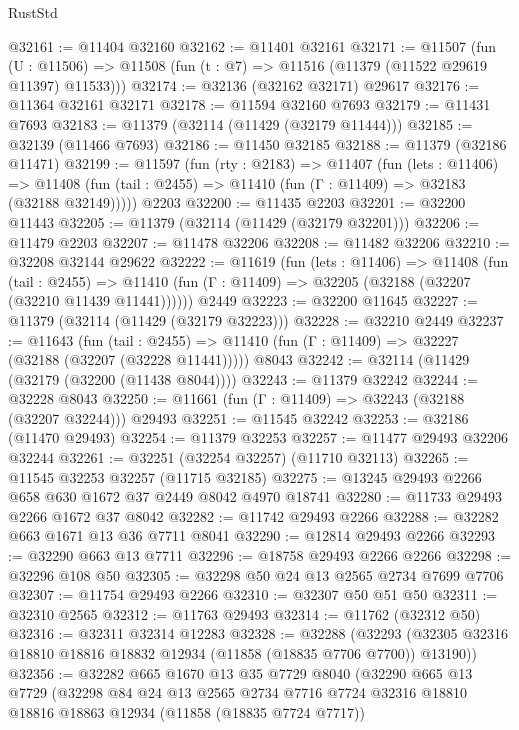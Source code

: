 \begin{lexlean}{RustStd}
\begin{coremodule}
@32161 := @11404 @32160
@32162 := @11401 @32161
@32171 := @11507
    (fun (U : @11506) => @11508 (fun (t : @7) => @11516 (@11379 (@11522 @29619 @11397) @11533)))
@32174 := @32136 (@32162 @32171) @29617
@32176 := @11364 @32161 @32171
@32178 := @11594 @32160 @7693
@32179 := @11431 @7693
@32183 := @11379 (@32114 (@11429 (@32179 @11444)))
@32185 := @32139 (@11466 @7693)
@32186 := @11450 @32185
@32188 := @11379 (@32186 @11471)
@32199 := @11597
    (fun (rty : @2183) =>
    @11407
      (fun (lets : @11406) =>
      @11408 (fun (tail : @2455) => @11410 (fun (Γ : @11409) => @32183 (@32188 @32149)))))
    @2203
@32200 := @11435 @2203
@32201 := @32200 @11443
@32205 := @11379 (@32114 (@11429 (@32179 @32201)))
@32206 := @11479 @2203
@32207 := @11478 @32206
@32208 := @11482 @32206
@32210 := @32208 @32144 @29622
@32222 := @11619
    (fun (lets : @11406) =>
    @11408
      (fun (tail : @2455) =>
      @11410 (fun (Γ : @11409) => @32205 (@32188 (@32207 (@32210 @11439 @11441))))))
    @2449
@32223 := @32200 @11645
@32227 := @11379 (@32114 (@11429 (@32179 @32223)))
@32228 := @32210 @2449
@32237 := @11643
    (fun (tail : @2455) => @11410 (fun (Γ : @11409) => @32227 (@32188 (@32207 (@32228 @11441)))))
    @8043
@32242 := @32114 (@11429 (@32179 (@32200 (@11438 @8044))))
@32243 := @11379 @32242
@32244 := @32228 @8043
@32250 := @11661 (fun (Γ : @11409) => @32243 (@32188 (@32207 @32244))) @29493
@32251 := @11545 @32242
@32253 := @32186 (@11470 @29493)
@32254 := @11379 @32253
@32257 := @11477 @29493 @32206 @32244
@32261 := @32251 (@32254 @32257) (@11710 @32113)
@32265 := @11545 @32253 @32257 (@11715 @32185)
@32275 := @13245 @29493 @2266 @658 @630 @1672 @37 @2449 @8042 @4970 @18741
@32280 := @11733 @29493 @2266 @1672 @37 @8042
@32282 := @11742 @29493 @2266
@32288 := @32282 @663 @1671 @13 @36 @7711 @8041
@32290 := @12814 @29493 @2266
@32293 := @32290 @663 @13 @7711
@32296 := @18758 @29493 @2266 @2266
@32298 := @32296 @108 @50
@32305 := @32298 @50 @24 @13 @2565 @2734 @7699 @7706
@32307 := @11754 @29493 @2266
@32310 := @32307 @50 @51 @50
@32311 := @32310 @2565
@32312 := @11763 @29493
@32314 := @11762 (@32312 @50)
@32316 := @32311 @32314 @12283
@32328 := @32288
    (@32293 (@32305 @32316 @18810 @18816 @18832 @12934 (@11858 (@18835 @7706 @7700)) @13190))
@32356 := @32282
    @665
    @1670
    @13
    @35
    @7729
    @8040
    (@32290
      @665
      @13
      @7729
      (@32298
        @84
        @24
        @13
        @2565
        @2734
        @7716
        @7724
        @32316
        @18810
        @18816
        @18863
        @12934
        (@11858 (@18835 @7724 @7717))

\end{coremodule}
\end{lexlean}
